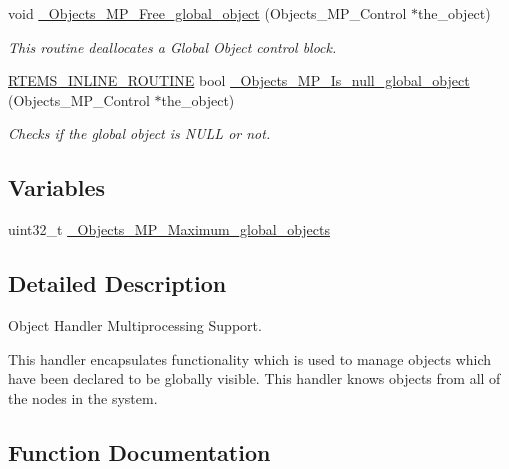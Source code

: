 \begin{DoxyCompactItemize}
void \mbox{\hyperlink{group__RTEMSScoreObjectMP_ga7046ff6304d231056117c0bbf5d72f14}{\+\_\+\+Objects\+\_\+\+M\+P\+\_\+\+Free\+\_\+global\+\_\+object}} (Objects\+\_\+\+M\+P\+\_\+\+Control $\ast$the\+\_\+object)
\begin{DoxyCompactList}\small\item\em This routine deallocates a Global Object control block. \end{DoxyCompactList}\item 
\mbox{\hyperlink{group__RTEMSScoreBaseDefs_gac216239df231d5dbd15e3520b0b9313f}{R\+T\+E\+M\+S\+\_\+\+I\+N\+L\+I\+N\+E\+\_\+\+R\+O\+U\+T\+I\+NE}} bool \mbox{\hyperlink{group__RTEMSScoreObjectMP_ga56fbd183d677d4aa85be7b6ce66de13b}{\+\_\+\+Objects\+\_\+\+M\+P\+\_\+\+Is\+\_\+null\+\_\+global\+\_\+object}} (Objects\+\_\+\+M\+P\+\_\+\+Control $\ast$the\+\_\+object)
\begin{DoxyCompactList}\small\item\em Checks if the global object is N\+U\+LL or not. \end{DoxyCompactList}\end{DoxyCompactItemize}
\subsection*{Variables}
\begin{DoxyCompactItemize}
\item 
uint32\+\_\+t \mbox{\hyperlink{group__RTEMSScoreObjectMP_ga33d2259b664cf64ff969534c0ecc8a3c}{\+\_\+\+Objects\+\_\+\+M\+P\+\_\+\+Maximum\+\_\+global\+\_\+objects}}
\end{DoxyCompactItemize}


\subsection{Detailed Description}
Object Handler Multiprocessing Support. 

This handler encapsulates functionality which is used to manage objects which have been declared to be globally visible. This handler knows objects from all of the nodes in the system. 

\subsection{Function Documentation}
\mbox{\label{group__RTEMSScoreObjectMP_gaee5f1bac6bea600e8f437c6cb0458f97}} 
